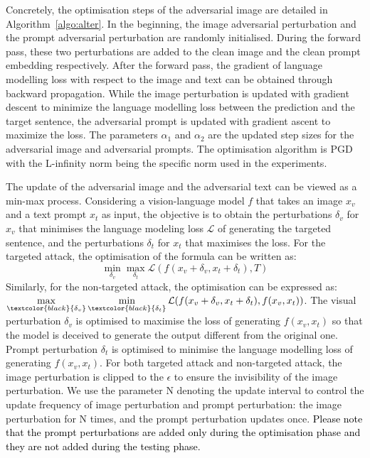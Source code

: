 Concretely, the optimisation steps of the adversarial image are detailed in Algorithm~\ref{algo:alter}. In the beginning, the image adversarial perturbation and the prompt adversarial perturbation are randomly initialised. During the forward pass, these two perturbations are added to the clean image and the clean prompt embedding respectively. After the forward pass, the gradient of language modelling loss with respect to the image and text can be obtained through backward propagation.  While the image perturbation is updated with gradient descent to minimize the language modelling loss between the prediction and the target sentence, the adversarial prompt is updated with gradient ascent to maximize the loss. The parameters $\alpha_1$ and $\alpha_2$ are the updated step sizes for the adversarial image and adversarial prompts. The optimisation algorithm is PGD~\citep{madry2017towards} with the L-infinity norm being the specific norm used in the experiments.

The update of the adversarial image and the adversarial text can be viewed as a min-max process. Considering a vision-language model \( f \) that takes an image \( x_v \) and a text prompt \( x_t \) as input, the objective is to obtain the perturbations \( \delta_v \) for \( x_v \) that minimises the language modeling loss \( \mathcal{L} \) of generating the targeted sentence, and the perturbations \( \delta_t \) for $x_t$ that maximises the loss.   For the targeted attack, the optimisation of the formula can be written as:
    \begin{equation}
        \min_{\delta_v} \max_{\delta_t} \mathcal{L}(f(x_v + \delta_v, x_t + \delta_t), T)
    \end{equation}
    \vspace{-0.1cm}
Similarly, for the non-targeted attack, the optimisation can be expressed as:
    $\displaystyle
    \max_{\textcolor{black}{\delta_v}} \min_{\textcolor{black}{\delta_t}} \mathcal{L}(f(x_v + \delta_v, x_t + \delta_t), f(x_v , x_t ))$.
The visual perturbation $\delta_v$ is optimised to maximise the loss of generating $f(x_v , x_t )$ so that the model is deceived to generate the output different from the original one. Prompt perturbation $\delta_t$ is optimised to minimise the language modelling loss of generating $f(x_v , x_t )$.  
For both targeted attack and non-targeted attack, the image perturbation is clipped to the $\epsilon$ to ensure the invisibility of the image perturbation. 
We use the parameter N denoting the update interval to control the update frequency of image perturbation and prompt perturbation: the image perturbation for N times, and the prompt perturbation updates once.  \textcolor{black}{Please note that the prompt perturbations are added only during the optimisation phase and they are not added during the testing phase.}

